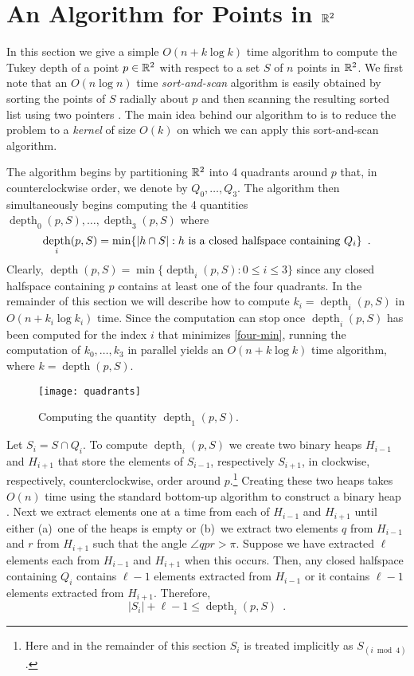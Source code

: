 \documentclass[charterfonts,lotsofwhite]{patmorin}
\DeclareMathOperator{\td}{depth}
\begin{document}
\section{An Algorithm for Points in $\mathbb{R}^2$}

In this section we give a simple $O(n + k\log k)$ time algorithm to
compute the Tukey depth of a point $p\in\mathbb{R}^2$ with respect to a set
$S$ of $n$ points in $\mathbb{R}^2$.  We first note that an $O(n\log n)$ time
\emph{sort-and-scan} algorithm is easily obtained by sorting the
points of $S$ radially about $p$ and then scanning the resulting
sorted list using two pointers \cite{m91}.  The main idea behind our
algorithm to is to reduce the problem to a \emph{kernel} of size
$O(k)$ on which we can apply this sort-and-scan algorithm.

The algorithm begins by partitioning $\mathbb{R}^2$ into 4 quadrants around
$p$ that, in counterclockwise order, we denote by $Q_0,\ldots,Q_3$.
The algorithm then simultaneously begins computing the 4 quantities
$\td_0(p,S),\ldots,\td_3(p,S)$ where 
\begin{equation}
     \td_i(p,S) = \min\{|h\cap S| : \mbox{$h$ is a closed halfspace containing $Q_i$} \} \enspace . \eqlabel{four-min}
\end{equation}
Clearly, $\td(p,S) = \min\{\td_i(p,S): 0\le i \le 3 \}$ since any
closed halfspace containing $p$ contains at least one of the four quadrants.
In the remainder of this section we will describe how to compute
$k_i=\td_i(p,S)$ in $O(n + k_i\log k_i)$ time.  Since the
computation can stop once $\td_i(p,S)$ has been computed for
the index $i$ that minimizes \eqref{four-min}, running the computation
of $k_0,\ldots,k_3$ in parallel yields an $O(n +
k\log k)$ time algorithm, where $k=\td(p,S)$.

\begin{figure}
\begin{center} \texttt{[image: quadrants]} \end{center}
\caption{Computing the quantity $\td_1(p,S)$.}
\end{figure}


Let $S_i=S\cap Q_i$. To compute $\td_i(p,S)$ we create two binary
heaps $H_{i-1}$ and $H_{i+1}$ that store the elements of $S_{i-1}$,
respectively $S_{i+1}$, in clockwise, respectively, counterclockwise,
order around $p$.\footnote{Here and in the remainder of this section
$S_i$ is treated implicitly as $S_{(i\bmod 4)}$.} 
Creating these two heaps takes $O(n)$ time using the
standard bottom-up algorithm to construct a binary heap
\cite[Chapter~6]{clrs01}.
Next we extract elements one at a time from each of $H_{i-1}$ and
$H_{i+1}$ until either (a)~one of the heaps is empty or (b)~we extract
two elements $q$ from $H_{i-1}$ and $r$ from $H_{i+1}$ such that the
angle $\angle qpr > \pi$.  Suppose we have extracted $\ell$ elements
each from $H_{i-1}$ and $H_{i+1}$ when this occurs.  
Then, any closed halfspace containing $Q_i$ contains $\ell-1$
elements extracted from $H_{i-1}$ or it contains $\ell-1$ elements
extracted from $H_{i+1}$.  Therefore,
\[  
  |S_i| + \ell - 1 \le \td_i(p,S) \enspace .
\]
\end{document}
